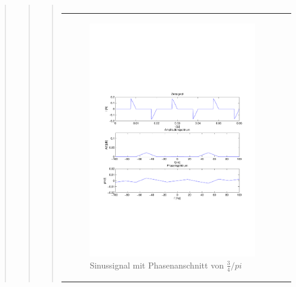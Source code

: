 \begin{quote}
\begin{quote}
\begin{quote}
\begin{center}
\begin{tabular}{ll}
                \end{tabular}
                \end{center}
    
                \begin{center}
                \begin{tabular}{ll}
    
                \hspace{-11em}
                    \begin{minipage}{0.6\textwidth}
    
                        \begin{figure}[H]
                            \label{fig:}
                            \includegraphics[scale=0.5, trim = 2cm 7cm 1.5cm 8.5cm, clip]{./Bilder/Phasenanschnitt68pi.pdf} %
                            \caption{Sinussignal mit Phasenanschnitt von $\frac{3}{4}/pi$}
                        \end{figure}
    

\end{minipage}
\end{tabular}
\end{center}
\end{quote}
\end{quote}
\end{quote}
